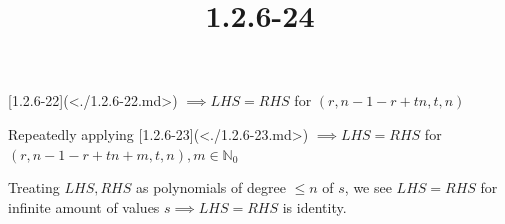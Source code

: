 \documentclass{article}
\title{1.2.6-24}
\begin{document}
\maketitle

[1.2.6-22](<./1.2.6-22.md>) \( \implies LHS = RHS \) for \( (r,n-1-r+tn,t,n) \)

Repeatedly applying [1.2.6-23](<./1.2.6-23.md>) \( \implies LHS = RHS \) for \( (r,n-1-r+tn + m,t,n), m \in \mathbb{N}_0 \)

Treating \( LHS, RHS \) as polynomials of degree \( \leq n \) of \( s \), we see \( LHS = RHS \) for infinite amount of values \( s \implies LHS = RHS \) is identity.
\end{document}
